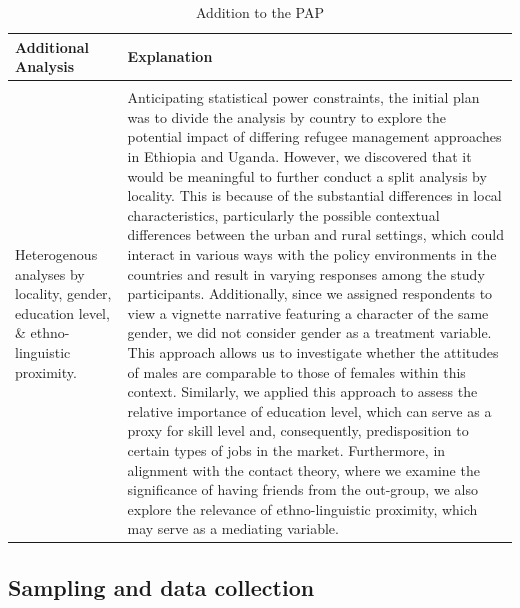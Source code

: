 \documentclass[a4paper,12pt]{article}
\begin{document}
\begin{appendix}
\vspace{5mm}
      \begin{table}[H]
        \begin{center}
        \caption{Addition to the PAP}
        \label{tab:addition}
               \begin{tabular}{m{8em}m{12cm}}
                \hline
                 \textbf{Additional Analysis} & \textbf{Explanation} \\
                \hline\hline
                & \\[-0.8em]
 Heterogenous analyses by locality, gender, education level, \& ethno-linguistic proximity. & Anticipating statistical power constraints, the initial plan was to divide the analysis by country to explore the potential impact of differing refugee management approaches in Ethiopia and Uganda. However, we discovered that it would be meaningful to further conduct a split analysis by locality. This is because of the substantial differences in local characteristics, particularly the possible contextual differences between the urban and rural settings, which could interact in various ways with the policy environments in the countries and result in
varying responses among the study participants. Additionally, since we assigned respondents to view a vignette narrative featuring a character of the same gender, we did not consider gender as a treatment variable. This approach allows us to investigate whether the attitudes of males are comparable to those of females within this context. Similarly, we applied this approach to assess the relative importance of education level, which can serve as a proxy for skill level and, consequently, predisposition to certain types of jobs in the market. Furthermore, in alignment with the contact theory, where we examine the significance of having friends from the out-group, we also explore the relevance of ethno-linguistic proximity, which may serve as a mediating variable. \\ 
                \hline
                \end{tabular}
        \end{center}
    \end{table}


\subsection{Sampling and data collection}
\label{sec:Sampling and data collection}

\onehalfspacing


\end{appendix}
\end{document}
